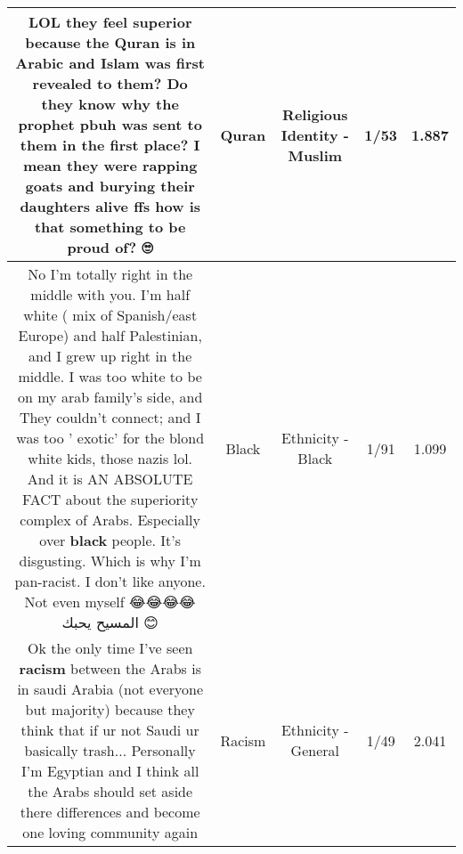 \documentclass[11pt]{article}
\newlength\mylength
\begin{document}
\begin{center}
\begin{longtable}{|C{.65\mylength}|C{.30\mylength}|C{.12\mylength}|C{.12\mylength}|C{.12\mylength}|}
  \small LOL they feel superior because the \textbf{Quran} is in Arabic and Islam was first revealed to them? Do they know why the prophet pbuh was sent to them in the first place? I mean they were rapping goats and burying their daughters alive ffs how is that something to be proud of? 🙄\normalsize   & Quran & Religious Identity - Muslim & 1/53 & 1.887 \\  \hline
  \small No I'm totally right in the middle with you. I'm half white ( mix of Spanish/east Europe) and half Palestinian, and I grew up right in the middle. I was too white to be on my arab family's side, and They couldn't connect; and I was too ' exotic' for the blond white kids, those nazis lol. And it is AN ABSOLUTE FACT about the superiority complex of Arabs. Especially over \textbf{black} people. It's disgusting. Which is why I'm pan-racist. I don't like anyone. Not even myself 😂😂😂😂 المسيح يحبك 😊\normalsize   & Black & Ethnicity - Black & 1/91 & 1.099 \\  \hline
  \small Ok the only time I've seen \textbf{racism} between the Arabs is in saudi Arabia (not everyone but majority) because they think that if ur not Saudi ur basically trash... Personally I'm Egyptian and I think all the Arabs should set aside there differences and become one loving community again\normalsize   & Racism & Ethnicity - General & 1/49 & 2.041 \\  \hline

\end{longtable}
\end{center}
\end{document}
